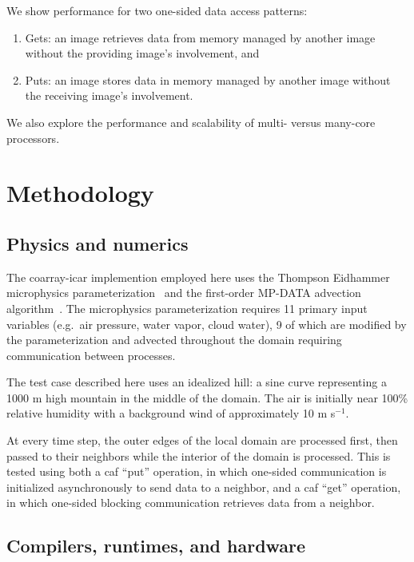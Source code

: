 We show performance for two one-sided data access patterns:
\begin{enumerate}
  \item Gets: an image retrieves data from memory managed by another
        image without the providing image's involvement, and
  \item Puts: an image stores data in memory managed by
        another image without the receiving image's involvement.
\end{enumerate}
We also explore the performance and scalability of multi- versus many-core processors.

\section{Methodology}
\subsection{Physics and numerics}
The coarray-\gls{icar} implemention employed here uses the Thompson Eidhammer microphysics parameterization~\cite{Thompson:2014cw} and the first-order MP-DATA advection algorithm~\cite{Smolarkiewicz:1998il}.
The microphysics parameterization requires 11 primary input variables (e.g.\ air pressure, water vapor, cloud water), 9 of which are modified by the parameterization and advected throughout the domain requiring communication between processes.

The test case described here uses an idealized hill: a sine curve representing
a 1000 m high mountain in the middle of the domain.
The air is initially near 100\% relative humidity with a background wind of approximately 10 m s$^{-1}$.

At every time step, the outer edges of the local domain are processed first,
then passed to their neighbors while the interior of the domain is processed.
This is tested using both a \gls{caf} ``put'' operation, in which one-sided communication is initialized asynchronously to send data to a neighbor,
and a \gls{caf} ``get'' operation, in which one-sided blocking communication retrieves data from a neighbor.

\subsection{Compilers, runtimes, and hardware}

